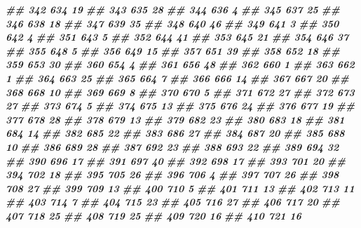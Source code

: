 \documentclass[
]{book}
\newenvironment{Shaded}{\begin{snugshade}}{\end{snugshade}}
\newcommand{\DocumentationTok}[1]{\textcolor[rgb]{0.56,0.35,0.01}{\textbf{\textit{#1}}}}
\theoremstyle{definition}
\theoremstyle{definition}
\theoremstyle{definition}
\theoremstyle{definition}
\theoremstyle{remark}
\begin{document}
\begin{Shaded}
\begin{Highlighting}[]
\DocumentationTok{\#\# 342    634 19}
\DocumentationTok{\#\# 343    635 28}
\DocumentationTok{\#\# 344    636  4}
\DocumentationTok{\#\# 345    637 25}
\DocumentationTok{\#\# 346    638 18}
\DocumentationTok{\#\# 347    639 35}
\DocumentationTok{\#\# 348    640 46}
\DocumentationTok{\#\# 349    641  3}
\DocumentationTok{\#\# 350    642  4}
\DocumentationTok{\#\# 351    643  5}
\DocumentationTok{\#\# 352    644 41}
\DocumentationTok{\#\# 353    645 21}
\DocumentationTok{\#\# 354    646 37}
\DocumentationTok{\#\# 355    648  5}
\DocumentationTok{\#\# 356    649 15}
\DocumentationTok{\#\# 357    651 39}
\DocumentationTok{\#\# 358    652 18}
\DocumentationTok{\#\# 359    653 30}
\DocumentationTok{\#\# 360    654  4}
\DocumentationTok{\#\# 361    656 48}
\DocumentationTok{\#\# 362    660  1}
\DocumentationTok{\#\# 363    662  1}
\DocumentationTok{\#\# 364    663 25}
\DocumentationTok{\#\# 365    664  7}
\DocumentationTok{\#\# 366    666 14}
\DocumentationTok{\#\# 367    667 20}
\DocumentationTok{\#\# 368    668 10}
\DocumentationTok{\#\# 369    669  8}
\DocumentationTok{\#\# 370    670  5}
\DocumentationTok{\#\# 371    672 27}
\DocumentationTok{\#\# 372    673 27}
\DocumentationTok{\#\# 373    674  5}
\DocumentationTok{\#\# 374    675 13}
\DocumentationTok{\#\# 375    676 24}
\DocumentationTok{\#\# 376    677 19}
\DocumentationTok{\#\# 377    678 28}
\DocumentationTok{\#\# 378    679 13}
\DocumentationTok{\#\# 379    682 23}
\DocumentationTok{\#\# 380    683 18}
\DocumentationTok{\#\# 381    684 14}
\DocumentationTok{\#\# 382    685 22}
\DocumentationTok{\#\# 383    686 27}
\DocumentationTok{\#\# 384    687 20}
\DocumentationTok{\#\# 385    688 10}
\DocumentationTok{\#\# 386    689 28}
\DocumentationTok{\#\# 387    692 23}
\DocumentationTok{\#\# 388    693 22}
\DocumentationTok{\#\# 389    694 32}
\DocumentationTok{\#\# 390    696 17}
\DocumentationTok{\#\# 391    697 40}
\DocumentationTok{\#\# 392    698 17}
\DocumentationTok{\#\# 393    701 20}
\DocumentationTok{\#\# 394    702 18}
\DocumentationTok{\#\# 395    705 26}
\DocumentationTok{\#\# 396    706  4}
\DocumentationTok{\#\# 397    707 26}
\DocumentationTok{\#\# 398    708 27}
\DocumentationTok{\#\# 399    709 13}
\DocumentationTok{\#\# 400    710  5}
\DocumentationTok{\#\# 401    711 13}
\DocumentationTok{\#\# 402    713 11}
\DocumentationTok{\#\# 403    714  7}
\DocumentationTok{\#\# 404    715 23}
\DocumentationTok{\#\# 405    716 27}
\DocumentationTok{\#\# 406    717 20}
\DocumentationTok{\#\# 407    718 25}
\DocumentationTok{\#\# 408    719 25}
\DocumentationTok{\#\# 409    720 16}
\DocumentationTok{\#\# 410    721 16}

\end{Highlighting}
\end{Shaded}
\end{document}
